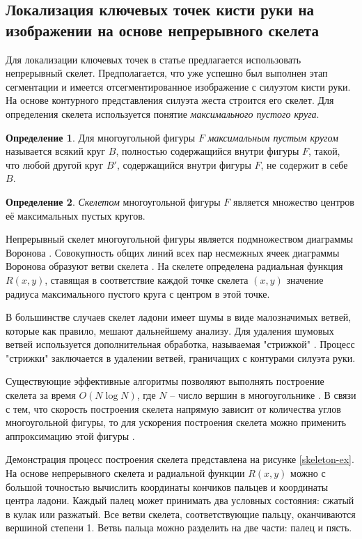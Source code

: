 \subsection{\nohyphens{Локализация ключевых точек кисти руки на изображении
на основе непрерывного скелета}}

Для локализации ключевых точек в статье \cite{nosov} предлагается
использовать непрерывный скелет. Предполагается, что уже успешно 
был выполнен этап сегментации и имеется отсегментированное
изображение с силуэтом кисти руки. На основе контурного представления
силуэта жеста строится его скелет. Для определения скелета
используется понятие {\it максимального пустого круга}.

{\bf Определение 1}. Для многоугольной фигуры $F$ {\it максимальным
пустым кругом} называется всякий круг $B$, полностью 
содержащийся внутри фигуры $F$, такой, что любой другой круг $B'$,
содержащийся внутри фигуры $F$, не содержит в себе $B$.

{\bf Определение 2}. {\it Скелетом} многоугольной фигуры $F$
является множество центров её максимальных пустых кругов.

Непрерывный скелет многоугольной фигуры является подмножеством
диаграммы Воронова \cite{mesteckij}. Совокупность общих линий всех пар 
несмежных ячеек диаграммы Воронова образуют ветви скелета 
\cite{mesteckij}. На скелете определена радиальная функция $R(x,y)$,
ставящая в соответствие каждой точке скелета $(x,y)$ значение
радиуса максимального пустого круга с центром в этой точке.

В большинстве случаев скелет ладони имеет шумы в виде
малозначимых ветвей, которые как правило, мешают дальнейшему анализу.
Для удаления шумовых ветвей используется дополнительная обработка,
называемая "стрижкой" \cite{mesteckij}. Процесс "стрижки" заключается
в удалении ветвей, граничащих с контурами силуэта руки.

Существующие эффективные алгоритмы позволяют выполнять построение 
скелета за время $O(N\log{N})$, где $N$ -- число вершин в
многоугольнике \cite{mesteckij-rejer}. В связи с тем, что скорость
построения скелета напрямую зависит от количества углов
многоугольной фигуры, то для ускорения построения скелета можно
применить аппроксимацию этой фигуры \cite{nosov-2}. 

Демонстрация процесс построения скелета представлена на рисунке
\ref{skeleton-ex}. На основе непрерывного скелета и радиальной
функции $R(x,y)$ можно с большой точностью вычислить координаты
кончиков пальцев и координаты центра ладони. Каждый палец может
принимать два условных состояния: сжатый в кулак или разжатый.
Все ветви скелета, соответствующие пальцу, оканчиваются вершиной
степени 1. Ветвь пальца можно разделить на две части: палец и пясть.

